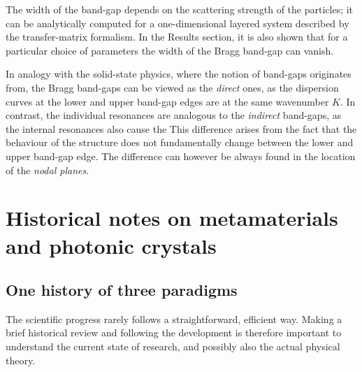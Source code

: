 The width of the band-gap depends on the scattering strength of the particles; it can be analytically computed for a one-dimensional layered system \cite{laktionov2008} described by the transfer-matrix formalism. In the Results section, it is also shown that for a particular choice of parameters the width of the Bragg band-gap can vanish. 

In analogy with the solid-state physics, where the notion of band-gaps originates from, the Bragg band-gaps can be viewed as the \textit{direct} ones, as the dispersion curves at the lower and upper band-gap edges are at the same wavenumber $K$. In contrast, the individual resonances are analogous to the \textit{indirect} band-gaps, as the internal resonances also cause the 
This difference arises from the fact that the behaviour of the structure does not fundamentally change between the lower and upper band-gap edge. The difference can however be always found in the location of the \textit{nodal planes}. 




\section{Historical notes on metamaterials and photonic crystals}
\subsection{One history of three paradigms} %
The scientific progress rarely follows a straightforward, efficient way. Making a brief historical review and following the development is therefore important to understand the current state of research, and possibly also the actual physical theory. 

